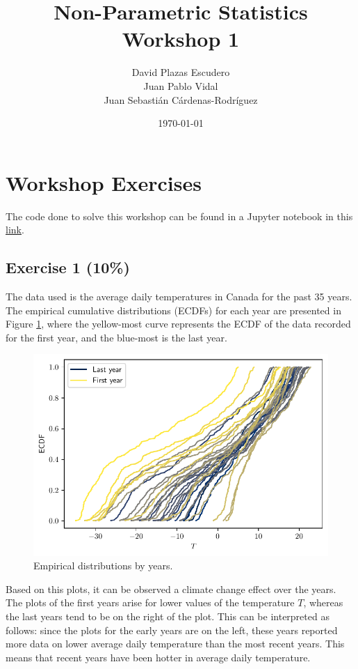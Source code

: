 \documentclass[11pt]{article}
\title{Non-Parametric Statistics Workshop 1}
\author{David Plazas Escudero \\
  Juan Pablo Vidal \\
  Juan Sebasti\'an C\'ardenas-Rodríguez \\
  \scalebox{0.7}{Mathematical Engineering, Universidad EAFIT}}
\date{\today}
\theoremstyle{definition}
\theoremstyle{remark}
\theoremstyle{remark}
\begin{document}
\maketitle
\section{Workshop Exercises}
The code done to solve this workshop can be found in a Jupyter
notebook in this \href{https://bit.ly/2SNMPod}{link}.
\subsection*{Exercise 1 (10\%)}
The data used is the average daily temperatures in Canada for the past
35 years. The empirical cumulative distributions (ECDFs) for each year
are presented in Figure \ref{fig:ecdfs_temps}, where the yellow-most
curve represents the ECDF of the data recorded for the first year, and
the blue-most is the last year.
\begin{figure}[H]
    \centering
    \includegraphics[scale=.5]{../figs/ecdfs.pdf}
    \caption{Empirical distributions by years.}
    \label{fig:ecdfs_temps}
\end{figure}

Based on this plots, it can be observed a climate change effect over
the years. The plots of the first years arise for lower values of the
temperature $T$, whereas the last years tend to be on the right of the
plot. This can be interpreted as follows: since the plots for the
early years are on the left, these years reported more data on lower
average daily temperature than the most recent years. This means that
recent years have been hotter in average daily temperature.
\end{document}
